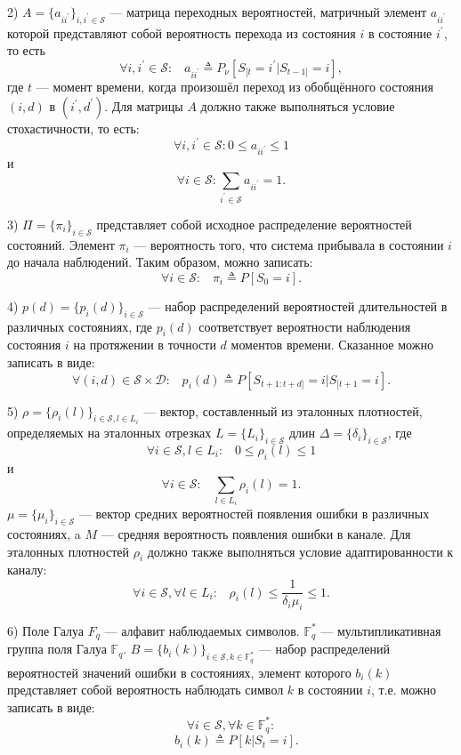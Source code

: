 \documentclass[twoside,12pt]{article}
\begin{document}
2) $A=\{a_{ii^\prime}\}_{i,i^\prime\in \mathcal{S}}$ --- матрица переходных вероятностей, матричный элемент $a_{ii^\prime}$ которой представляют собой вероятность перехода из состояния $i$ в состояние $i^\prime$, то есть
$$\forall i,i^\prime \in \mathcal{S}: \;\;\; a_{ii^\prime} \triangleq P_\nu[S_{[t}=i^\prime|S_{t-1]}=i],$$
где $t$ --- момент времени, когда произошёл переход из обобщённого состояния $(i,d)$ в $(i^\prime,d^\prime)$. Для матрицы $A$ должно также выполняться условие стохастичности, то есть:
$$\forall i,i^\prime \in \mathcal{S}: 0\leq a_{ii^\prime} \leq 1$$
и
$$\forall i \in \mathcal{S}: \sum\limits_{i^\prime\in \mathcal{S}} a_{ii^\prime}=1.$$

3) $\Pi=\{\pi_{i}\}_{i\in \mathcal{S}}$ представляет собой исходное распределение вероятностей состояний. Элемент $\pi_{i}$  --- вероятность того, что система прибывала в состоянии $i$ до начала наблюдений. Таким образом, можно записать:
$$\forall i\in \mathcal{S}:\;\;\; \pi_{i}\triangleq P[S_{0}=i].$$

4) $p(d)=\{p_i(d)\}_{i\in\mathcal{S}}$ --- набор распределений вероятностей длительностей в различных состояниях, где $p_i(d)$ соответствует вероятности наблюдения состояния $i$ на протяжении в точности $d$ моментов времени. Сказанное можно записать в виде:
$$\forall (i,d) \in \mathcal{S}\times \mathcal{D}: \;\;\; p_i(d)\triangleq P[S_{t+1:t+d]}=i|S_{[t+1}=i].$$

5) $\rho=\{\rho_i(l)\}_{i\in\mathcal{S}, l \in L_i}$ --- вектор, составленный из эталонных плотностей, определяемых на эталонных отрезках $L=\{L_i\}_{i\in\mathcal{S}}$ длин $\Delta=\{\delta_i\}_{i\in\mathcal{S}}$, где
$$\forall i\in \mathcal{S}, l \in L_i :\;\;\; 0\leq \rho_i (l)\leq 1$$
и
$$\forall i\in \mathcal{S}:\;\;\; \sum\limits_{l\in L_i} \rho_i(l)=1.$$
$\mu=\{{\mu}_i\}_{i\in\mathcal{S}}$ --- вектор средних вероятностей появления ошибки в различных состояниях, a $M$ --- средняя вероятность появления ошибки в канале. Для эталонных плотностей $\rho_i$ должно также выполняться условие адаптированности к каналу:
$$\forall i\in \mathcal{S}, \forall l \in L_i :\;\;\; \rho_i(l)\leq \frac{1}{\delta_i \mu_i}\leq 1.$$

6) Поле Галуа $F_q$ --- алфавит наблюдаемых символов. $\mathbb{F}^\ast_q$ --- мультипликативная группа поля Галуа $\mathbb{F}_q$. $B=\{b_{i}(k)\}_{i \in \mathcal{S}, k \in \mathbb{F}^\ast_q}$ --- набор распределений вероятностей значений ошибки в состояниях, элемент которого $b_{i}(k)$ представляет собой вероятность наблюдать символ $k$ в состоянии $i$, т.е. можно записать в виде:
$$\forall i \in \mathcal{S},\forall k \in \mathbb{F}^\ast_q :$$
$$\;\;\; b_{i}(k)\triangleq P[k|S_{t}=i].$$
\end{document}

